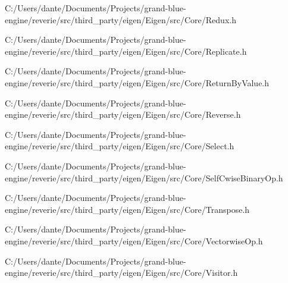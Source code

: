 \begin{DoxyCompactItemize}
C\+:/\+Users/dante/\+Documents/\+Projects/grand-\/blue-\/engine/reverie/src/third\+\_\+party/eigen/\+Eigen/src/\+Core/Redux.\+h\item 
C\+:/\+Users/dante/\+Documents/\+Projects/grand-\/blue-\/engine/reverie/src/third\+\_\+party/eigen/\+Eigen/src/\+Core/Replicate.\+h\item 
C\+:/\+Users/dante/\+Documents/\+Projects/grand-\/blue-\/engine/reverie/src/third\+\_\+party/eigen/\+Eigen/src/\+Core/Return\+By\+Value.\+h\item 
C\+:/\+Users/dante/\+Documents/\+Projects/grand-\/blue-\/engine/reverie/src/third\+\_\+party/eigen/\+Eigen/src/\+Core/Reverse.\+h\item 
C\+:/\+Users/dante/\+Documents/\+Projects/grand-\/blue-\/engine/reverie/src/third\+\_\+party/eigen/\+Eigen/src/\+Core/Select.\+h\item 
C\+:/\+Users/dante/\+Documents/\+Projects/grand-\/blue-\/engine/reverie/src/third\+\_\+party/eigen/\+Eigen/src/\+Core/Self\+Cwise\+Binary\+Op.\+h\item 
C\+:/\+Users/dante/\+Documents/\+Projects/grand-\/blue-\/engine/reverie/src/third\+\_\+party/eigen/\+Eigen/src/\+Core/Transpose.\+h\item 
C\+:/\+Users/dante/\+Documents/\+Projects/grand-\/blue-\/engine/reverie/src/third\+\_\+party/eigen/\+Eigen/src/\+Core/Vectorwise\+Op.\+h\item 
C\+:/\+Users/dante/\+Documents/\+Projects/grand-\/blue-\/engine/reverie/src/third\+\_\+party/eigen/\+Eigen/src/\+Core/Visitor.\+h\end{DoxyCompactItemize}
